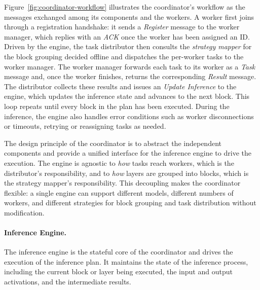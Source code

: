 Figure~\ref{fig:coordinator-workflow} illustrates the coordinator's workflow as the messages exchanged among its components and the workers.
A worker first joins through a registration handshake: it sends a \emph{Register} message to the worker manager, which replies with an \emph{ACK} once the worker has been assigned an ID.
Driven by the engine, the task distributor then consults the \emph{strategy mapper} for the block grouping decided offline and dispatches the per-worker tasks to the worker manager.
The worker manager forwards each task to its worker as a \emph{Task} message and, once the worker finishes, returns the corresponding \emph{Result} message.
The distributor collects these results and issues an \emph{Update Inference} to the engine, which updates the inference state and advances to the next block.
This loop repeats until every block in the plan has been executed. During the inference, the engine also handles error conditions such as worker disconnections or timeouts, retrying or reassigning tasks as needed.

The design principle of the coordinator is to abstract the independent components and provide a unified interface for the inference engine to drive the execution.
The engine is agnostic to \emph{how} tasks reach workers, which is the distributor's responsibility, and to \emph{how} layers are grouped into blocks, which is the strategy mapper's responsibility.
This decoupling makes the coordinator flexible: a single engine can support different models, different numbers of workers, and different strategies for block grouping and task distribution without modification.

\paragraph{Inference Engine.}
The inference engine is the stateful core of the coordinator and drives the execution of the inference plan.
It maintains the state of the inference process, including the current block or layer being executed, the input and output activations, and the intermediate results.

